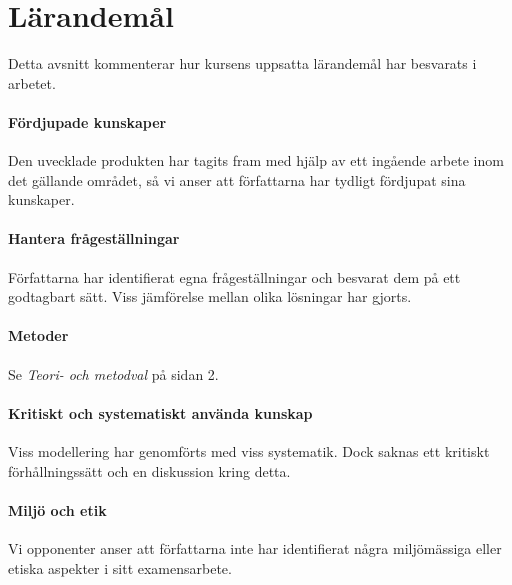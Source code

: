 \section{Lärandemål} %
\label{sec:l_randem_l}
    Detta avsnitt kommenterar hur kursens uppsatta lärandemål har besvarats i arbetet.

    \paragraph{Fördjupade kunskaper}
        Den uvecklade produkten har tagits fram med hjälp av ett ingående arbete inom det gällande området, så vi anser att författarna har tydligt fördjupat sina kunskaper.

    \paragraph{Hantera frågeställningar}
        Författarna har identifierat egna frågeställningar och besvarat dem på ett godtagbart sätt. Viss jämförelse mellan olika lösningar har gjorts.

    \paragraph{Metoder}
        Se \emph{Teori- och metodval} på sidan 2.

    \paragraph{Kritiskt och systematiskt använda kunskap}
        Viss modellering har genomförts med viss systematik. Dock saknas ett kritiskt förhållningssätt och en diskussion kring detta.

    \paragraph{Miljö och etik}
        Vi opponenter anser att författarna inte har identifierat några miljömässiga eller etiska aspekter i sitt examensarbete.


